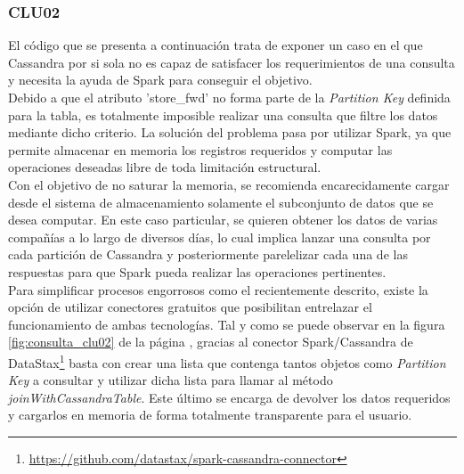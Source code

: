 \clearpage

\subsubsection[]{CLU02}

El código que se presenta a continuación trata de exponer un caso en el que Cassandra por si sola no es capaz de satisfacer los requerimientos de una consulta y necesita la ayuda de Spark para conseguir el objetivo.\\

Debido a que el atributo 'store\_fwd' no forma parte de la \textit{Partition Key} definida para la tabla, es totalmente imposible realizar una consulta que filtre los datos mediante dicho criterio. La solución del problema pasa por utilizar Spark, ya que permite almacenar en memoria los registros requeridos y computar las operaciones deseadas libre de toda limitación estructural.\\

Con el objetivo de no saturar la memoria, se recomienda encarecidamente cargar desde el sistema de almacenamiento solamente el subconjunto de datos que se desea computar. En este caso particular, se quieren obtener los datos de varias compañías a lo largo de diversos días, lo cual implica lanzar una consulta por cada partición de Cassandra y posteriormente parelelizar cada una de las respuestas para que Spark pueda realizar las operaciones pertinentes.\\    

Para simplificar procesos engorrosos como el recientemente descrito, existe la opción de utilizar conectores gratuitos que posibilitan entrelazar el funcionamiento de ambas tecnologías. Tal y como se puede observar en la figura \ref{fig:consulta_clu02} de la página \pageref{fig:consulta_clu02}, gracias al conector Spark/Cassandra de DataStax\footnote{\url{https://github.com/datastax/spark-cassandra-connector}} basta con crear una lista que contenga tantos objetos como \textit{Partition Key} a consultar y utilizar dicha lista para llamar al método \textit{joinWithCassandraTable}. Este último se encarga de devolver los datos requeridos y cargarlos en memoria de forma totalmente transparente para el usuario.\\

